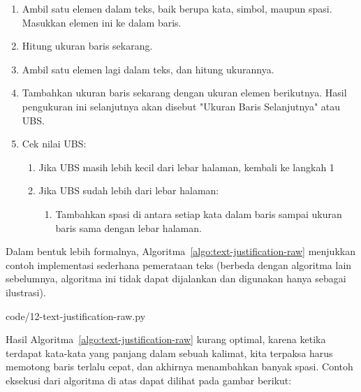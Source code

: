\begin{enumerate}
    \item Ambil satu elemen dalam teks, baik berupa kata, simbol, maupun spasi. Masukkan elemen ini ke dalam baris.
    \item Hitung ukuran baris sekarang.
    \item Ambil satu elemen lagi dalam teks, dan hitung ukurannya.
    \item Tambahkan ukuran baris sekarang dengan ukuran elemen berikutnya. Hasil pengukuran ini selanjutnya akan disebut "Ukuran Baris Selanjutnya" atau UBS.
    \item Cek nilai UBS:
        \begin{enumerate}
            \item Jika UBS masih lebih kecil dari lebar halaman, kembali ke langkah 1
            \item Jika UBS sudah lebih dari lebar halaman:
                \begin{enumerate}
                    \item Tambahkan spasi di antara setiap kata dalam baris sampai ukuran baris sama dengan lebar halaman.
                \end{enumerate}
        \end{enumerate}
\end{enumerate}

Dalam bentuk lebih formalnya, Algoritma~\ref{algo:text-justification-raw} menjukkan contoh implementasi sederhana pemerataan teks (berbeda dengan algoritma lain sebelumnya, algoritma ini tidak dapat dijalankan dan digunakan hanya sebagai ilustrasi).


                {code/12-text-justification-raw.py}

Hasil Algoritma~\ref{algo:text-justification-raw} kurang optimal, karena ketika terdapat kata-kata yang panjang dalam sebuah kalimat, kita terpaksa harus memotong baris terlalu cepat, dan akhirnya menambahkan banyak spasi. Contoh eksekusi dari algoritma di atas dapat dilihat pada gambar berikut:

